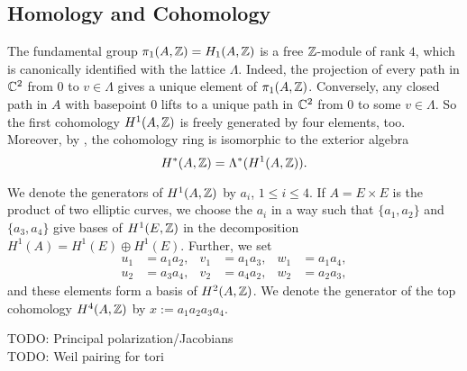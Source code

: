 \subsection{Homology and Cohomology}
The fundamental group $\pi_1(A,\mathbb{Z}) = H_1(A,\mathbb{Z})$ is a free $\mathbb{Z}$-module of rank $4$, which is canonically identified with the lattice $\Lambda$. Indeed, the projection of every path in $\mathbb{C}^2$ from $0$ to $v\in \Lambda$ gives a unique element of $\pi_1(A,\mathbb{Z})$. Conversely, any closed path in $A$ with basepoint $0$ lifts to a unique path in $\mathbb{C}^2$ from $0$ to some $v\in\Lambda$.
So the first cohomology $H^1(A,\mathbb{Z})$ is freely generated by four elements, too. Moreover, by \cite[Sect.~I.1]{Mumford}, the cohomology ring is isomorphic to the exterior algebra
$$
H^*(A,\mathbb{Z}) = \Lambda^*(H^1(A,\mathbb{Z})).
$$
\begin{notation}
We denote the generators of $H^1(A,\mathbb{Z})$ by $a_i$, $1\leq i\leq 4$. If $A=E\times E$ is the product of two elliptic curves, we choose the $a_i$ in a way such that $\{a_1,a_2\}$ and $\{a_3,a_4\}$ give bases of $H^1(E,\mathbb{Z})$ in the decomposition $H^1(A) = H^1(E)\oplus H^1(E)$.
Further, we set  
\begin{align*}
u_1 &= a_1 a_2, & v_1 &= a_1 a_3, & w_1 &= a_1 a_4, \\ 
u_2 &= a_3 a_4, & v_2 &= a_4 a_2, & w_2 &= a_2 a_3,
\end{align*}
and these elements form a basis of $H^2(A,\mathbb{Z})$. We denote the generator of the top cohomology $H^4(A,\mathbb{Z})$ by $x := a_1 a_2 a_3 a_4$.
\end{notation}




TODO: Principal polarization/Jacobians \\
TODO: Weil pairing for tori